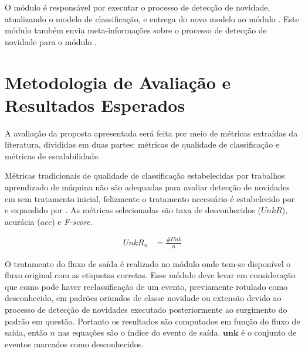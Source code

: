O módulo \detector é responsável por executar o processo de detecção de
novidade, atualizando o modelo de classificação, e entrega do novo modelo
ao módulo \classify.
Este módulo também envia meta-informações sobre o processo de detecção de
novidade para o módulo \sink.

\section{Metodologia de Avaliação e Resultados Esperados}\label{sec:esperados}


A avaliação da proposta apresentada será feita por meio de métricas extraídas da
literatura, divididas em duas partes: métricas de qualidade de classificação
e métricas de escalabilidade.

Métricas tradicionais de qualidade de classificação estabelecidas por trabalhos
aprendizado de máquina não são adequadas para avaliar detecção de novidades em
\streams sem tratamento inicial, felizmente o tratamento necessário é
estabelecido por  e expandido por
.
As métricas selecionadas são taxa de desconhecidos ($UnkR$), acurácia ($acc$) e \emph{F-score}.

\begin{align}
  \mathit{UnkR}_n   &= \frac{ \#Unk }{n}
\end{align}

O tratamento do fluxo de saída é realizado no módulo \sink onde tem-se
disponível o fluxo original com as etiquetas corretas.
Esse módulo deve levar em consideração que
como pode haver reclassificação de um evento, previamente rotulado como
desconhecido, em padrões oriundos de classe novidade ou extensão devido ao
processo de detecção de novidades executado posteriormente ao surgimento
do padrão em questão.
Portanto os resultados são computados em função do fluxo de saída, então $n$ nas
equações são o índice do evento de saída.
$\mathbf{unk}$ é o conjunto de eventos marcados como desconhecidos.

